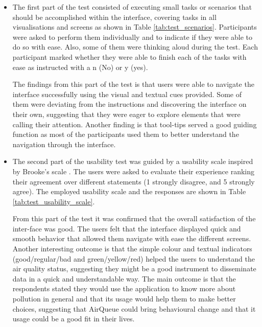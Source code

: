 \begin{itemize}

	\item  The first part of the test consisted of executing small tasks or scenarios that should be accomplished within the interface, covering tasks in all visualisations and screens as shown in Table \ref{tab:test_scenarios}. Participants were asked to perform them individually and to indicate if they were able to do so with ease. Also, some of them were thinking aloud during the test. Each participant marked whether they were able to finish each of the tasks with ease as instructed with a n (No) or y (yes). 

The findings from this part of the test is that users were able to navigate the interface successfully using the visual and textual cues provided. Some of them were deviating from the instructions and discovering the interface on their own, suggesting that they were eager to explore elements that were calling their attention. Another finding is that tool-tips served a good guiding function as most of the participants used them to better understand the navigation through the interface.

	\item The second part of the usability test was guided by a usability scale inspired by Brooke's scale \cite{Brooke1996}. The users were asked to evaluate their experience ranking their agreement over different statements (1 strongly disagree, and 5 strongly agree). The employed usability scale and the responses are shown in Table \ref{tab:test_usability_scale}. 


From this part of the test it was confirmed that the overall satisfaction of the inter-face was good. The users felt that the interface displayed quick and smooth behavior that allowed them navigate with ease the different screens. Another interesting outcome is that the simple colour and textual indicators (good/regular/bad and green/yellow/red) helped the users to understand the air quality status, suggesting they might be a good instrument to disseminate data in a quick and understandable way. The main outcome is that the respondents stated they would use the application to know more about pollution in general and that its usage would help them to make better choices, suggesting that AirQueue could bring behavioural change and that it usage could be a good fit in their lives.

\end{itemize}


